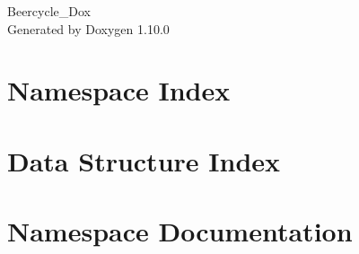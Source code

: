 \documentclass[twoside]{book}
\newcommand{\+}{\discretionary{\mbox{\scriptsize$\hookleftarrow$}}{}{}}
\newcommand{\clearemptydoublepage}{%
    \newpage{\pagestyle{empty}\cleardoublepage}%
  }
\begin{document}
  \raggedbottom
    \hypersetup{pageanchor=false,
                bookmarksnumbered=true,
                pdfencoding=unicode
               }
  \begin{titlepage}
  \vspace*{7cm}
  \begin{center}%
  {\Large Beercycle\+\_\+\+Dox}\\
  \vspace*{1cm}
  {\large Generated by Doxygen 1.10.0}\\
  \end{center}
  \end{titlepage}
  \clearemptydoublepage
  \tableofcontents
  \clearemptydoublepage
  \hypersetup{pageanchor=true}
\chapter{Namespace Index}

\chapter{Data Structure Index}

\chapter{Namespace Documentation}










\end{document}
